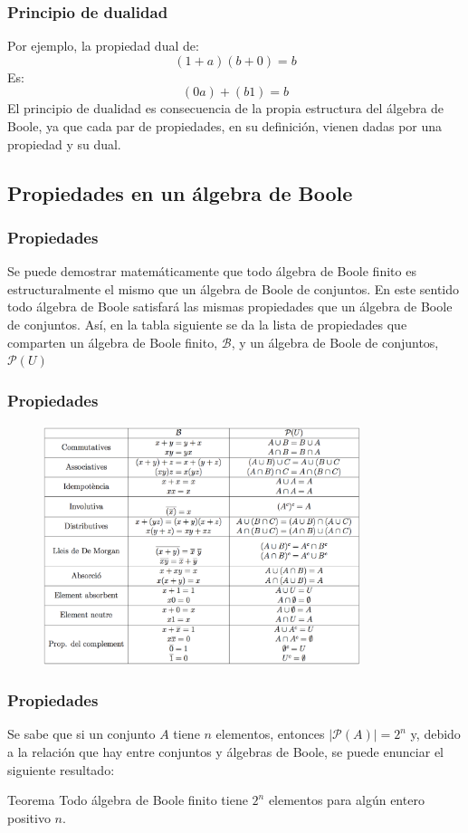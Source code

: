\documentclass{beamer}
\begin{document}
\begin{frame}
\frametitle{Principio de dualidad}

Por ejemplo, la propiedad dual de: 
\[(1+a)(b+0) = b\]
Es:
\[(0a)+(b1) = b\]
El principio de dualidad es consecuencia de la propia estructura del \'algebra de Boole, ya que cada par de propiedades, en su definici\'on, vienen dadas por una propiedad y su dual.
\end{frame}

\subsection{Propiedades en un \'algebra de Boole}

\begin{frame}
\frametitle{Propiedades}
Se puede demostrar matem\'aticamente que todo \'algebra de Boole finito es estructuralmente el mismo que un \'algebra de Boole de conjuntos. En este sentido todo \'algebra de Boole satisfar\'a las mismas propiedades que un \'algebra de Boole de conjuntos. As\'i, en la tabla siguiente se da la lista de propiedades que comparten un \'algebra de Boole finito, $\mathcal{B}$, y un \'algebra de Boole de conjuntos, $\mathcal{P}(U)$

\end{frame}




\begin{frame}
\frametitle{Propiedades}

\begin{figure}[h]
  \label{figura propiedades}
\centering
\includegraphics[height=7.0cm]{propietats}
\end{figure}

\end{frame}


\begin{frame}
\frametitle{Propiedades}
Se sabe que si un conjunto $A$ tiene $n$ elementos, entonces $|\mathcal{P}(A)| = 2^n$ y, debido a la relaci\'on que hay entre conjuntos y \'algebras de Boole, se puede enunciar el siguiente resultado:
\begin{block}{Teorema}
Todo \'algebra de Boole finito tiene $2^n$ elementos para alg\'un entero positivo $n$.
\end{block}
\end{frame}
\end{document}

